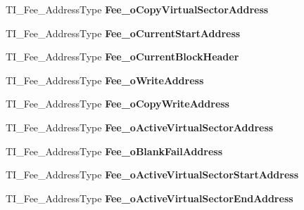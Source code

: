 \begin{DoxyCompactItemize}
T\+I\+\_\+\+Fee\+\_\+\+Address\+Type {\bfseries Fee\+\_\+o\+Copy\+Virtual\+Sector\+Address}
\item 
\mbox{\label{structTI__Fee__GlobalVarsType_a97cb2151bfbd702528d4607d7a27e551}} 
T\+I\+\_\+\+Fee\+\_\+\+Address\+Type {\bfseries Fee\+\_\+o\+Current\+Start\+Address}
\item 
\mbox{\label{structTI__Fee__GlobalVarsType_a7dddd1711f8de5222bdf3fb1cdb3e219}} 
T\+I\+\_\+\+Fee\+\_\+\+Address\+Type {\bfseries Fee\+\_\+o\+Current\+Block\+Header}
\item 
\mbox{\label{structTI__Fee__GlobalVarsType_af005ad6f73ba507d8ec176764b089c57}} 
T\+I\+\_\+\+Fee\+\_\+\+Address\+Type {\bfseries Fee\+\_\+o\+Write\+Address}
\item 
\mbox{\label{structTI__Fee__GlobalVarsType_a51fcf533f6168f8c291a895cf67e0e92}} 
T\+I\+\_\+\+Fee\+\_\+\+Address\+Type {\bfseries Fee\+\_\+o\+Copy\+Write\+Address}
\item 
\mbox{\label{structTI__Fee__GlobalVarsType_a0d584a7211585d8120417e97c5488b0a}} 
T\+I\+\_\+\+Fee\+\_\+\+Address\+Type {\bfseries Fee\+\_\+o\+Active\+Virtual\+Sector\+Address}
\item 
\mbox{\label{structTI__Fee__GlobalVarsType_aadf7842200bc7a6feb9995306b785d75}} 
T\+I\+\_\+\+Fee\+\_\+\+Address\+Type {\bfseries Fee\+\_\+o\+Blank\+Fail\+Address}
\item 
\mbox{\label{structTI__Fee__GlobalVarsType_a168ae6614bbd7393d4241597f5e4dc19}} 
T\+I\+\_\+\+Fee\+\_\+\+Address\+Type {\bfseries Fee\+\_\+o\+Active\+Virtual\+Sector\+Start\+Address}
\item 
\mbox{\label{structTI__Fee__GlobalVarsType_a218b4a24a6bd2bffbb8acb3644ceb9ab}} 
T\+I\+\_\+\+Fee\+\_\+\+Address\+Type {\bfseries Fee\+\_\+o\+Active\+Virtual\+Sector\+End\+Address}
\item 
\mbox{\label{structTI__Fee__GlobalVarsType_ac528f87140fc8fb28e1d8016631ce412}} 

\end{DoxyCompactItemize}
